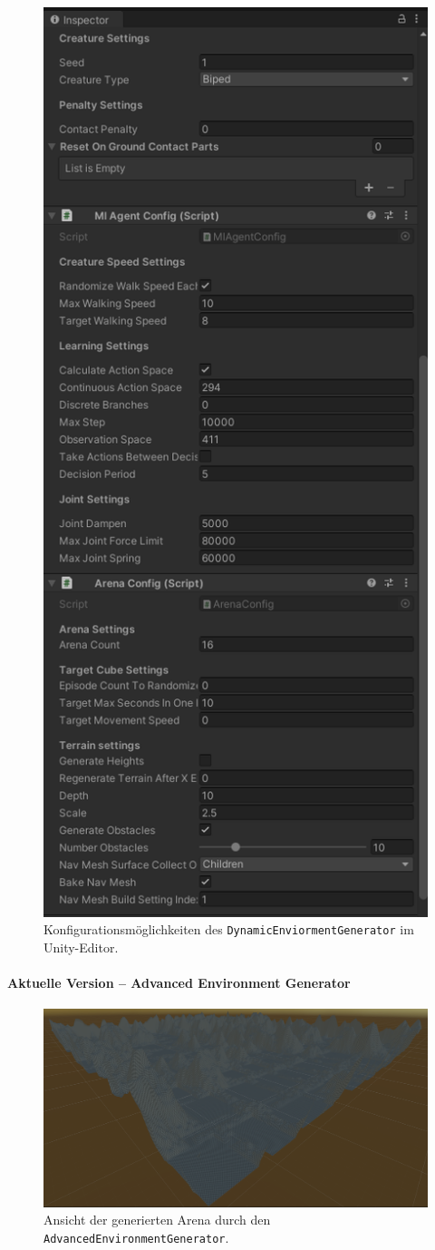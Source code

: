 \begin{figure}
	\centering
	\includegraphics[width=0.5\linewidth]{resources/img/DEGConfig}
	\caption[Konfigurationsmöglichkeiten des \texttt{DynamicEnviormentGenerator}]{Konfigurationsmöglichkeiten des \texttt{DynamicEnviormentGenerator} im Unity-Editor.} 
	\label{bspDEGOptionen}
\end{figure}

\paragraph{Aktuelle Version -- Advanced Environment Generator}
\begin{figure}
	\centering
	\includegraphics[width=0.7\linewidth]{resources/img/AEGArena.png}
	\caption[Konfigurationsmöglichkeiten des \texttt{AdvancedEnviormentGenerator}]{Ansicht der generierten Arena durch den \texttt{AdvancedEnvironmentGenerator}.} 
	\label{bspAEGArena}
\end{figure}

